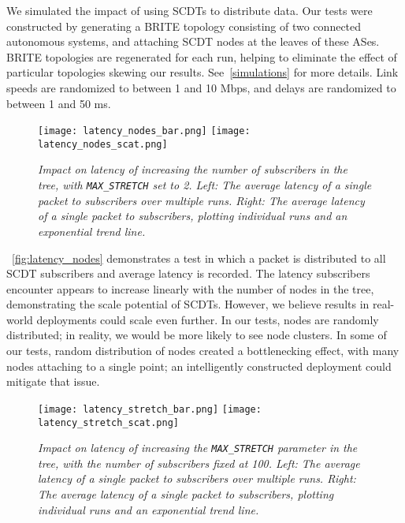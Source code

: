 We simulated the impact of using SCDTs to distribute data. Our tests were constructed by generating a BRITE \cite{brite} topology consisting of two connected autonomous systems, and attaching SCDT nodes at the leaves of these ASes.  BRITE topologies are regenerated for each run, helping to eliminate the effect of particular topologies skewing our results.  See~\autoref{simulations} for more details. Link speeds are randomized to between 1 and 10 Mbps, and delays are randomized to between 1 and 50 ms.

\begin{figure}[h]
	\begin{center}
		\texttt{[image: latency\_nodes\_bar.png]}
		\texttt{[image: latency\_nodes\_scat.png]}
	\end{center}
	\vspace{-1.3em}
	\caption{\small \itshape Impact on latency of increasing the number of subscribers in the tree, with \texttt{MAX\_STRETCH} set to 2. Left: The average latency of a single packet to subscribers over multiple runs. Right: The average latency of a single packet to subscribers, plotting individual runs and an exponential trend line.}
	\vspace{-1em}
	\label{fig:latency_nodes}
\end{figure}

~\autoref{fig:latency_nodes} demonstrates a test in which a packet is distributed to all SCDT subscribers and average latency is recorded. The latency subscribers encounter appears to increase linearly with the number of nodes in the tree, demonstrating the scale potential of SCDTs. However, we believe results in real-world deployments could scale even further. In our tests, nodes are randomly distributed; in reality, we would be more likely to see node clusters. In some of our tests, random distribution of nodes created a bottlenecking effect, with many nodes attaching to a single point; an intelligently constructed deployment could mitigate that issue.

\begin{figure}[h]
	\begin{center}
		\texttt{[image: latency\_stretch\_bar.png]}
		\texttt{[image: latency\_stretch\_scat.png]}
	\end{center}
	\vspace{-1.3em}
	\caption{\small \itshape Impact on latency of increasing the \texttt{MAX\_STRETCH} parameter in the tree, with the number of subscribers fixed at 100. Left: The average latency of a single packet to subscribers over multiple runs. Right: The average latency of a single packet to subscribers, plotting individual runs and an exponential trend line.}
	\vspace{-1em}
	\label{fig:stretch_nodes}
\end{figure}

